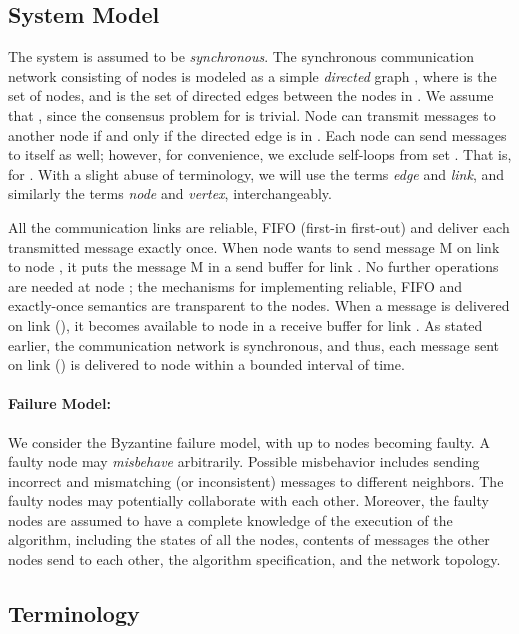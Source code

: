 \documentclass[letterpaper, 11pt]{article}
\begin{document}
\subsection{System Model}
The system is assumed to be {\em synchronous}.
The synchronous communication network consisting
of  nodes is modeled as a simple {\em directed} graph , where  is the set of  nodes, and  is the set of directed edges between the nodes in .  We assume that , since the consensus problem for  is trivial.  Node  can transmit messages to another node  if and only if the directed edge  is in . Each node can send messages to itself as well; however, for convenience, we {exclude self-loops} from set . That is,  for . With a slight abuse of terminology, we will use the terms {\em edge} and {\em link}, and similarly the terms
{\em node} and {\em vertex},
 interchangeably.




All the communication links are reliable,
FIFO (first-in first-out) and deliver each transmitted message exactly once.
When node  wants to send message M on link  to node , it
puts the message M in a send buffer for link . No further operations
are needed at node ; the mechanisms for implementing reliable,
FIFO and exactly-once semantics 
are transparent to the nodes. When a message is delivered on link (),
it becomes available to node  in a receive buffer for link .
As stated earlier, the communication network is synchronous, and thus,
each message sent on link () is delivered to node  within a 
bounded interval of time.


\paragraph{Failure Model:}
We consider the Byzantine failure model, with up to  nodes becoming faulty. A faulty node may {\em misbehave} arbitrarily. Possible misbehavior includes sending incorrect and mismatching (or inconsistent) messages to different neighbors. The faulty nodes may potentially collaborate with each other. Moreover, the faulty nodes are assumed to have a complete knowledge of the execution of the algorithm, including the states of all the nodes, contents of messages the other nodes send to each other, the algorithm specification, and the network topology.



\subsection{Terminology}
\end{document}
